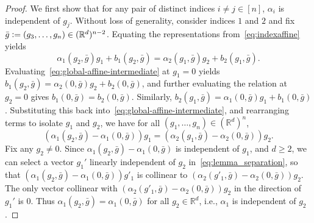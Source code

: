 \documentclass[twoside,11pt]{article}
\newcommand{\R}{\mathbb{R}}
\begin{document}
\begin{proof}
    We first show that for any pair of distinct indices $i \neq j \in [n]$, $\alpha_i$ is independent of $g_j$. 
    Without loss of generality, consider indices $1$ and $2$ and fix $\bar{g} \vcentcolon= (g_3, \ldots, g_n) \in (\R^d)^{n-2}$. 
    Equating the representations from~\eqref{eq:indexaffine} yields
    \begin{equation}\label{eq:global-affine-intermediate}
        \alpha_1(g_2, \bar{g}) g_1 + b_1(g_2, \bar{g}) = \alpha_2(g_1, \bar{g}) g_2 + b_2(g_1, \bar{g}).
    \end{equation}
    Evaluating~\eqref{eq:global-affine-intermediate} at $g_1=0$ yields $b_1(g_2, \bar{g}) = \alpha_2(0, \bar{g}) g_2 + b_2(0, \bar{g})$, and further evaluating the relation at $g_2=0$ gives $b_1(0, \bar{g}) = b_2(0, \bar{g})$. 
    Similarly, $b_2(g_1, \bar{g}) = \alpha_1(0, \bar{g}) g_1 + b_1(0, \bar{g})$.
    Substituting this back into~\eqref{eq:global-affine-intermediate}, and rearranging terms to isolate $g_1$ and $g_2$, we have for all $(g_1, \ldots, g_n) \in (\R^d)^n$,
    \begin{equation}\label{eq:lemma_separation}
        (\alpha_1(g_2, \bar{g}) - \alpha_1(0, \bar{g})) g_1 = (\alpha_2(g_1, \bar{g}) - \alpha_2(0, \bar{g})) g_2.
    \end{equation}
    Fix any $g_2 \neq 0$.
    Since $\alpha_1(g_2, \bar{g}) - \alpha_1(0, \bar{g})$ is independent of $g_1$, and $d \geq 2$, we can select a vector $g_1'$ linearly independent of $g_2$ in~\eqref{eq:lemma_separation}, so that $(\alpha_1(g_2, \bar{g}) - \alpha_1(0, \bar{g})) g'_1$ is collinear to $(\alpha_2(g'_1, \bar{g}) - \alpha_2(0, \bar{g})) g_2$. 
    The only vector collinear with $(\alpha_2(g'_1, \bar{g}) - \alpha_2(0, \bar{g})) g_2$ in the direction of $g_1'$ is $0$.
    Thus $\alpha_1(g_2, \bar{g}) = \alpha_1(0, \bar{g})$ for all $g_2\in\R^d$, i.e., $\alpha_1$ is independent of $g_2$. 


\end{proof}
\end{document}
